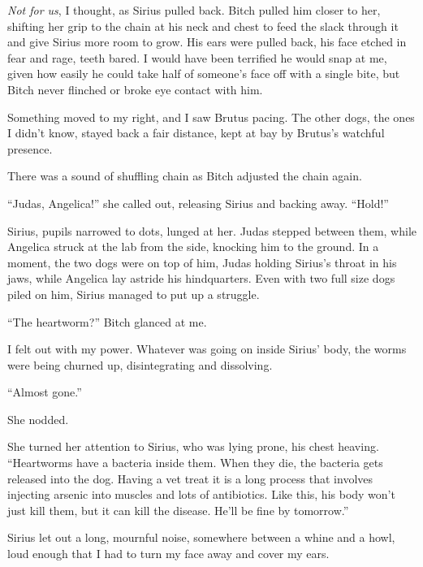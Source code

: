 \emph{Not for us}, I thought, as Sirius pulled back.  Bitch pulled him closer to her, shifting her grip to the chain at his neck and chest to feed the slack through it and give Sirius more room to grow.  His ears were pulled back, his face etched in fear and rage, teeth bared.  I would have been terrified he would snap at me, given how easily he could take half of someone's face off with a single bite, but Bitch never flinched or broke eye contact with him.



Something moved to my right, and I saw Brutus pacing.  The other dogs, the ones I didn't know, stayed back a fair distance, kept at bay by Brutus's watchful presence.



There was a sound of shuffling chain as Bitch adjusted the chain again.



``Judas, Angelica!'' she called out, releasing Sirius and backing away.  ``Hold!''



Sirius, pupils narrowed to dots, lunged at her.  Judas stepped between them, while Angelica struck at the lab from the side, knocking him to the ground.  In a moment, the two dogs were on top of him, Judas holding Sirius's throat in his jaws, while Angelica lay astride his hindquarters.  Even with two full size dogs piled on him, Sirius managed to put up a struggle.



``The heartworm?'' Bitch glanced at me.



I felt out with my power.  Whatever was going on inside Sirius' body, the worms were being churned up, disintegrating and dissolving.



``Almost gone.''



She nodded.



She turned her attention to Sirius, who was lying prone, his chest heaving.  ``Heartworms have a bacteria inside them.  When they die, the bacteria gets released into the dog.  Having a vet treat it is a long process that involves injecting arsenic into muscles and lots of antibiotics.  Like this, his body won't just kill them, but it can kill the disease.  He'll be fine by tomorrow.''



Sirius let out a long, mournful noise, somewhere between a whine and a howl, loud enough that I had to turn my face away and cover my ears.



